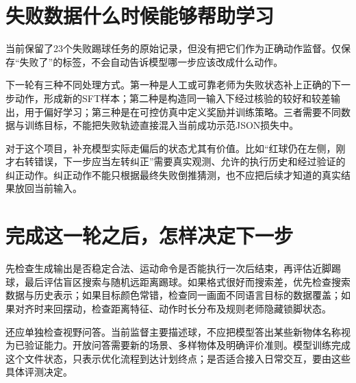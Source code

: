 \section{失败数据什么时候能够帮助学习}
当前保留了23个失败踢球任务的原始记录，但没有把它们作为正确动作监督。仅保存“失败了”的标签，不会自动告诉模型哪一步应该改成什么动作。

下一轮有三种不同处理方式。第一种是人工或可靠老师为失败状态补上正确的下一步动作，形成新的SFT样本；第二种是构造同一输入下经过核验的较好和较差输出，用于偏好学习；第三种是在可控仿真中定义奖励并训练策略。三者需要不同数据与训练目标，不能把失败轨迹直接混入当前成功示范JSON损失中。

对于这个项目，补充模型实际走偏后的状态尤其有价值。比如“红球仍在左侧，刚才右转错误，下一步应当左转纠正”需要真实观测、允许的执行历史和经过验证的纠正动作。纠正动作不能只根据最终失败倒推猜测，也不应把后续才知道的真实结果放回当前输入。

\section{完成这一轮之后，怎样决定下一步}
先检查生成输出是否稳定合法、运动命令是否能执行一次后结束，再评估近脚踢球，最后评估盲区搜索与随机远距离踢球。如果格式很好而搜索差，优先检查搜索数据与历史表示；如果目标颜色常错，检查同一画面不同语言目标的数据覆盖；如果对齐时来回摆动，检查距离特征、动作时长分布及规则老师隐藏锁脚状态。

还应单独检查视野问答。当前监督主要描述球，不应把模型答出某些新物体名称视为已验证能力。开放问答需要新的场景、多样物体及明确评价准则。模型训练完成这个文件状态，只表示优化流程到达计划终点；是否适合接入日常交互，要由这些具体评测决定。
